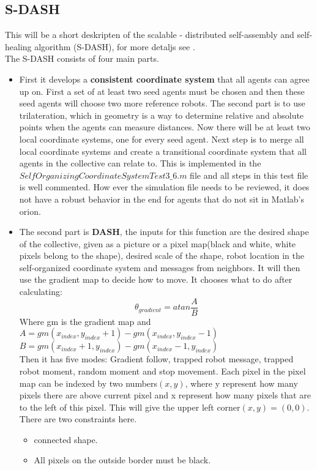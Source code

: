 \subsection{S-DASH }
This will be a short deskripten of the scalable - distributed self-assembly and self-healing algorithm (S-DASH), for more detaljs see \cite{Ruben}.\\
The S-DASH consists of four main parts.\\
\begin{itemize}
\item First it develops a \textbf{consistent coordinate system} that all agents can agree up on. First a set of at least two seed agents must be chosen and then these seed agents will choose two more reference robots. The second part is to use trilateration, which in geometry is a way to determine relative and absolute points when the agents can measure distances. Now there will be at least two local coordinate systems, one for every seed agent. Next step is to merge all local coordinate systems and create a transitional coordinate system that all agents in the collective can relate to. This is implemented in the $SelfOrganizingCoordinateSystemTest3\_6.m$ file and all steps in this test file is well commented. How ever the simulation file needs to be reviewed, it does not have a robust behavior in the end for agents that do not sit in Matlab's orion.

\item The second part is \textbf{DASH}, the inputs for this function are the desired shape of the collective, given as a picture or a pixel map(black and white, white pixels belong to the shape), desired scale of the shape, robot location in the self-organized coordinate system and messages from neighbors. It will then use the gradient map to decide how to move. It chooses what to do after calculating:
\begin{equation}
\theta_{gradient} = atan\frac{A}{B}
\end{equation}
Where gm is the gradient map and\\
$A = gm(x_{index}, y_{index}+1) - gm(x_{index}, y_{index}-1)$\\
$B =  gm(x_{index}+1, y_{index}) - gm(x_{index}-1, y_{index})$\\

Then it has five modes: Gradient follow, trapped robot message, trapped robot moment, random moment and stop movement.
Each pixel in the pixel map can be indexed by two numbers$(x,y)$, where y represent how many pixels there are above current pixel and x represent how many pixels that are to the left of this pixel.
This will give the upper left corner$ (x,y) = (0,0)$.
There are two constraints here.
\begin{itemize}
\item connected shape.
\item All pixels on the outside border must be black.
\end{itemize}


\end{itemize}
